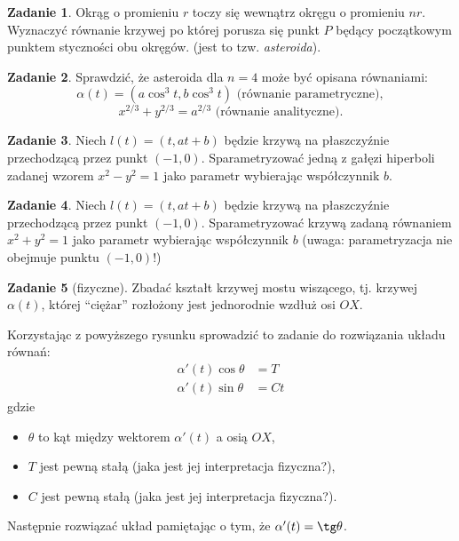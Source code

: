 \documentclass[a4paper,11pt]{article}
\theoremstyle{definition}\newtheorem{exercise}{Zadanie}
\theoremstyle{definition}\newtheorem{remark}{Uwaga}
\begin{document}
\begin{exercise}
Okrąg o promieniu $r$ toczy się wewnątrz okręgu o promieniu $nr$. Wyznaczyć 
r\'ownanie krzywej po kt\'orej porusza się punkt $P$ będący początkowym punktem 
styczności obu okręg\'ow. (jest to tzw. \textit{asteroida}).
\end{exercise}

\begin{exercise}
 Sprawdzić, że asteroida dla $n=4$ może być opisana równaniami:
\[\alpha(t)=(a \cos^3{t},b\cos^3{t})\text{ (r\'ownanie parametryczne)},\] 
\[x^{2/3}+y^{2/3}=a^{2/3}\text{ (r\'ownanie analityczne)}.\]
\end{exercise}

\begin{exercise}
Niech $l(t)=(t,at+b)$ będzie krzywą na płaszczyźnie przechodzącą przez punkt 
$(-1,0)$. Sparametryzować jedną z gałęzi hiperboli zadanej wzorem $x^2-y^2=1$ 
jako parametr wybierając współczynnik $b$.
\end{exercise}

\begin{exercise}
Niech $l(t)=(t,at+b)$ będzie krzywą na płaszczyźnie przechodzącą przez punkt 
$(-1,0)$. Sparametryzować krzywą zadaną równaniem $x^2+y^2=1$ jako parametr 
wybierając współczynnik $b$ (uwaga: parametryzacja nie obejmuje punktu 
$(-1,0)$!)
\end{exercise}



\begin{exercise}[fizyczne]
Zbadać kształt krzywej mostu wiszącego, tj. krzywej $\alpha(t)$, kt\'orej 
``ciężar'' rozłożony jest jednorodnie wzdłuż osi $OX$. 

Korzystając z powyższego rysunku sprowadzić to zadanie do rozwiązania układu 
równań:
\begin{align*}
\alpha'(t)\cos\theta&=T\\
\alpha'(t)\sin\theta&=Ct
\end{align*}
gdzie 
\begin{itemize}
 \item $\theta$ to kąt między wektorem $\alpha'(t)$ a osią $OX$, 
 \item $T$ jest pewną stałą (jaka jest jej interpretacja fizyczna?),
 \item $C$ jest pewną stałą (jaka jest jej interpretacja fizyczna?).
\end{itemize}
Następnie rozwiązać układ pamiętając o tym, że $\alpha'(t)=\tg\theta$.
\end{exercise}
\end{document}
